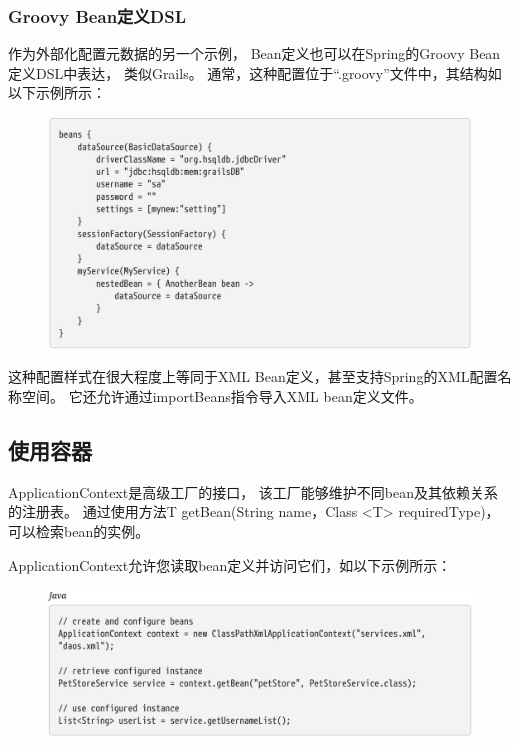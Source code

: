 \subsubsection{Groovy Bean定义DSL}
作为外部化配置元数据的另一个示例，
Bean定义也可以在Spring的Groovy Bean定义DSL中表达，
类似Grails。 
通常，这种配置位于“.groovy”文件中，其结构如以下示例所示：

\begin{figure}[ht]
    \centering
    \includegraphics[width=1\linewidth]{./Figure/IMG_code_6.png}
\end{figure}
    
这种配置样式在很大程度上等同于XML Bean定义，甚至支持Spring的XML配置名称空间。 
它还允许通过importBeans指令导入XML bean定义文件。

\subsection{使用容器}

ApplicationContext是高级工厂的接口，
该工厂能够维护不同bean及其依赖关系的注册表。 
通过使用方法T getBean(String name，Class <T> requiredType)，可以检索bean的实例。

ApplicationContext允许您读取bean定义并访问它们，如以下示例所示：

\begin{figure}[ht]
    \centering
    \includegraphics[width=1\linewidth]{./Figure/IMG_code_7.png}
\end{figure}

